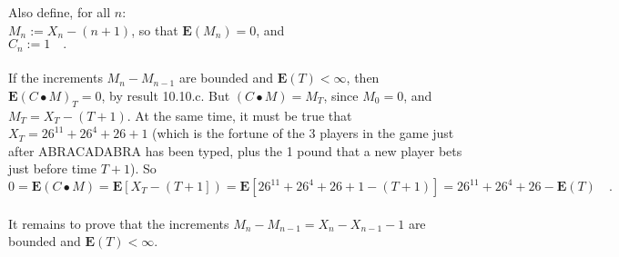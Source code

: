 \documentclass[11pt]{article} %
\begin{document}
Also define, for all $n$:\\
$M_{n}:=X_{n}-(n+1)$, so that $\mathrm{\textbf{E}}\left(M_{n}\right)=0$, and\\
$C_{n}:=1\quad.$\\
\\
If the increments $M_{n}-M_{n-1}$ are bounded and $\mathrm{\textbf{E}}\left(T\right)< \infty$, then $\mathrm{\textbf{E}}\left(C \bullet M\right)_{T}=0$, by result 10.10.c. But $\left(C \bullet M\right)=M_{T}$, since $M_{0}=0$, and $M_{T}=X_{T}-\left(T+1\right)$. At the same time, it must be true that $X_{T}=26^{11}+26^{4}+26+1$ (which is the fortune of the 3 players in the game just after ABRACADABRA has been typed, plus the 1 pound that a new player bets just before time $T+1$). So $0=\mathrm{\textbf{E}}\left(C \bullet M\right)=\mathrm{\textbf{E}}\left[X_{T}-\left(T+1\right] \right)=\mathrm{\textbf{E}}\left[26^{11}+26^{4}+26+1-\left(T+1\right)\right]=26^{11}+26^{4}+26-\mathrm{\textbf{E}}\left(T\right)\quad.$\\
\\
It remains to prove that the increments $M_{n}-M_{n-1}=X_{n}-X_{n-1}-1$ are bounded and $\mathrm{\textbf{E}}\left(T\right)< \infty$.






\clearpage
\end{document}
